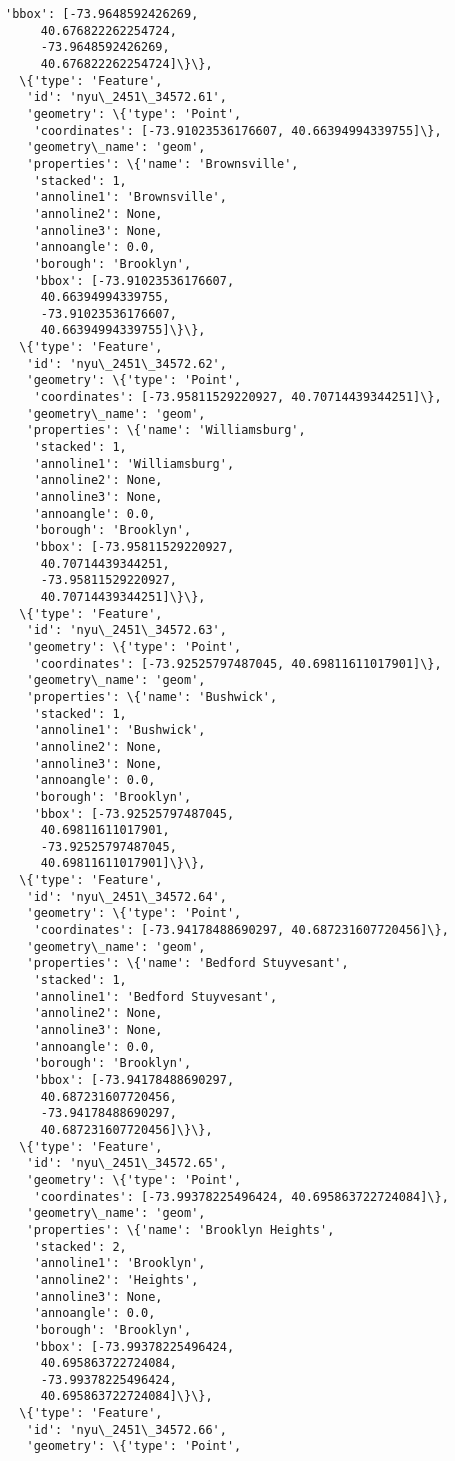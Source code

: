 \documentclass[11pt]{article}
\begin{document}
\begin{tcolorbox}[breakable, size=fbox, boxrule=.5pt, pad at break*=1mm, opacityfill=0]
\begin{Verbatim}[commandchars=\\\{\}]
    'bbox': [-73.9648592426269,
     40.676822262254724,
     -73.9648592426269,
     40.676822262254724]\}\},
  \{'type': 'Feature',
   'id': 'nyu\_2451\_34572.61',
   'geometry': \{'type': 'Point',
    'coordinates': [-73.91023536176607, 40.66394994339755]\},
   'geometry\_name': 'geom',
   'properties': \{'name': 'Brownsville',
    'stacked': 1,
    'annoline1': 'Brownsville',
    'annoline2': None,
    'annoline3': None,
    'annoangle': 0.0,
    'borough': 'Brooklyn',
    'bbox': [-73.91023536176607,
     40.66394994339755,
     -73.91023536176607,
     40.66394994339755]\}\},
  \{'type': 'Feature',
   'id': 'nyu\_2451\_34572.62',
   'geometry': \{'type': 'Point',
    'coordinates': [-73.95811529220927, 40.70714439344251]\},
   'geometry\_name': 'geom',
   'properties': \{'name': 'Williamsburg',
    'stacked': 1,
    'annoline1': 'Williamsburg',
    'annoline2': None,
    'annoline3': None,
    'annoangle': 0.0,
    'borough': 'Brooklyn',
    'bbox': [-73.95811529220927,
     40.70714439344251,
     -73.95811529220927,
     40.70714439344251]\}\},
  \{'type': 'Feature',
   'id': 'nyu\_2451\_34572.63',
   'geometry': \{'type': 'Point',
    'coordinates': [-73.92525797487045, 40.69811611017901]\},
   'geometry\_name': 'geom',
   'properties': \{'name': 'Bushwick',
    'stacked': 1,
    'annoline1': 'Bushwick',
    'annoline2': None,
    'annoline3': None,
    'annoangle': 0.0,
    'borough': 'Brooklyn',
    'bbox': [-73.92525797487045,
     40.69811611017901,
     -73.92525797487045,
     40.69811611017901]\}\},
  \{'type': 'Feature',
   'id': 'nyu\_2451\_34572.64',
   'geometry': \{'type': 'Point',
    'coordinates': [-73.94178488690297, 40.687231607720456]\},
   'geometry\_name': 'geom',
   'properties': \{'name': 'Bedford Stuyvesant',
    'stacked': 1,
    'annoline1': 'Bedford Stuyvesant',
    'annoline2': None,
    'annoline3': None,
    'annoangle': 0.0,
    'borough': 'Brooklyn',
    'bbox': [-73.94178488690297,
     40.687231607720456,
     -73.94178488690297,
     40.687231607720456]\}\},
  \{'type': 'Feature',
   'id': 'nyu\_2451\_34572.65',
   'geometry': \{'type': 'Point',
    'coordinates': [-73.99378225496424, 40.695863722724084]\},
   'geometry\_name': 'geom',
   'properties': \{'name': 'Brooklyn Heights',
    'stacked': 2,
    'annoline1': 'Brooklyn',
    'annoline2': 'Heights',
    'annoline3': None,
    'annoangle': 0.0,
    'borough': 'Brooklyn',
    'bbox': [-73.99378225496424,
     40.695863722724084,
     -73.99378225496424,
     40.695863722724084]\}\},
  \{'type': 'Feature',
   'id': 'nyu\_2451\_34572.66',
   'geometry': \{'type': 'Point',

\end{Verbatim}
\end{tcolorbox}
\end{document}
